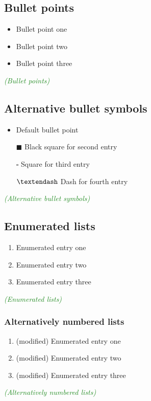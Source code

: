 \documentclass{article}
\newcommand{\ccheck}[1]{\textcolor{ForestGreen}{\emph{(\checkmark #1)}}} %
\begin{document}
\subsection{Bullet points}
\begin{itemize}
    \item Bullet point one
    \item Bullet point two
    \item Bullet point three
  \end{itemize}
\ccheck{Bullet points}

\subsection{Alternative bullet symbols}
\begin{itemize}
    \item  Default bullet point
    \item[$\blacksquare$]  Black square for second entry
    \item[$\square$]  Square for third entry
    \item[$\textendash$] Dash for fourth entry
   \end{itemize}
\ccheck{Alternative bullet symbols}

\subsection{Enumerated lists}

\begin{enumerate}
    \item Enumerated entry one
    \item Enumerated entry two
    \item Enumerated entry three
  \end{enumerate}
\ccheck{Enumerated lists}

\subsubsection{Alternatively numbered lists}
\renewcommand{\labelenumi}{\Roman{enumi}}
\begin{enumerate}
    \item (modified) Enumerated entry one
    \item (modified) Enumerated entry two
    \item (modified) Enumerated entry three
  \end{enumerate}
\ccheck{Alternatively numbered lists}
\end{document}
